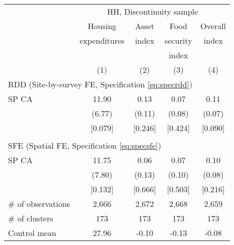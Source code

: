 \begin{tabular}{lcccc}
\hline \hline
 & \multicolumn{4}{c}{HH, Discontinuity sample} \\
\cmidrule(lr){2-5}
 & Housing & Asset & Food & Overall \\
 & expenditures & index & security & index \\
 & & & index & \\
\cmidrule(lr){2-2}\cmidrule(lr){3-3}\cmidrule(lr){4-4}\cmidrule(lr){5-5}
 & (1) & (2) & (3) & (4) \\
\hline
\multicolumn{4}{l}{RDD (Site-by-survey FE, Specification \ref{eq:specrdd})} & \\
\cmidrule(lr){1-4}
SP CA & 11.90 & 0.13 & 0.07 & 0.11 \\
 & (6.77) & (0.11) & (0.08) & (0.07) \\
 & [0.079] & [0.246] & [0.424] & [0.090] \\
\\[-0.5em]
\multicolumn{4}{l}{SFE (Spatial FE, Specification \ref{eq:specsfe})} & \\
\cmidrule(lr){1-4}
SP CA & 11.75 & 0.06 & 0.07 & 0.10 \\
 & (7.80) & (0.13) & (0.10) & (0.08) \\
 & [0.132] & [0.666] & [0.503] & [0.216] \\
\hline
\# of observations & 2,666 & 2,672 & 2,668 & 2,659 \\
\# of clusters & 173 & 173 & 173 & 173 \\
Control mean & 27.96 & -0.10 & -0.13 & -0.08 \\
\hline
\end{tabular}
